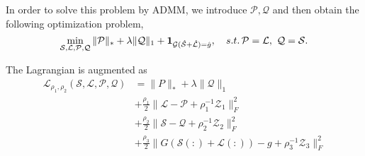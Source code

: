 \documentclass[a4paper,12pt]{article}
\theoremstyle{mystyle}
\begin{document}
\begin{CJK*}{GBK}{song}
In order to solve this problem by ADMM, we introduce $\mathcal{P}, \mathcal{Q}$ and then obtain the following optimization problem,
\begin{equation}\label{e3}
\min_{\mathcal{S},\mathcal{L},\mathcal{P},\mathcal{Q}}
\|\mathcal{P}\|_*+\lambda\|\mathcal{Q}\|_1+
{\bf1}_{\mathcal{G}\mathcal{(\hat{S}+\hat{L})}={\hat{g}}},
\quad s.t.\, \mathcal{P=L,~Q=S}.
\end{equation}


The Lagrangian is augmented as
\begin{align}
\mathcal{L}_{\rho_1,\rho_2}(\mathcal{S},\mathcal{L},\mathcal{P},\mathcal{Q})
&=\|P\|_*+\lambda \|\mathcal{Q}\|_1\\
&+\frac{\rho_1}{2}\|\mathcal{L-P}+\rho_1^{-1}\mathcal{Z}_1\|_{F}^2\\
&+\frac{\rho_2}{2}\|\mathcal{S-Q}+\rho_2^{-1}\mathcal{Z}_2\|_{F}^2\\
&+\frac{\rho_3}{2}\|G\mathcal{(S(:)+L(:))}-g+\rho_3^{-1}\mathcal{Z}_3\|_{F}^2
\end{align}


\end{CJK*}
\end{document}
